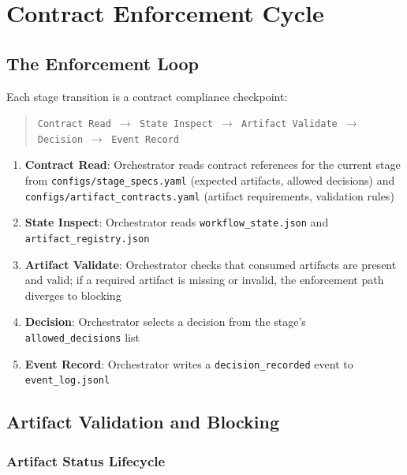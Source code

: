 \documentclass[11pt,a4paper]{article}
\begin{document}
\section{Contract Enforcement Cycle}
\label{sec:enforcement}

\subsection{The Enforcement Loop}

Each stage transition is a contract compliance checkpoint:

\begin{quote}
\texttt{Contract Read $\rightarrow$ State Inspect $\rightarrow$ Artifact Validate $\rightarrow$ Decision $\rightarrow$ Event Record}
\end{quote}

\begin{enumerate}[leftmargin=*,itemsep=1pt]
    \item \textbf{Contract Read}: Orchestrator reads contract references for the current stage from \texttt{configs/stage\_specs.yaml} (expected artifacts, allowed decisions) and \texttt{configs/artifact\_contracts.yaml} (artifact requirements, validation rules)
    \item \textbf{State Inspect}: Orchestrator reads \texttt{workflow\_state.json} and \texttt{artifact\_registry.json}
    \item \textbf{Artifact Validate}: Orchestrator checks that consumed artifacts are present and valid; if a required artifact is missing or invalid, the enforcement path diverges to blocking
    \item \textbf{Decision}: Orchestrator selects a decision from the stage's \texttt{allowed\_decisions} list
    \item \textbf{Event Record}: Orchestrator writes a \texttt{decision\_recorded} event to \texttt{event\_log.jsonl}
\end{enumerate}

\subsection{Artifact Validation and Blocking}

\subsubsection{Artifact Status Lifecycle}
\end{document}
